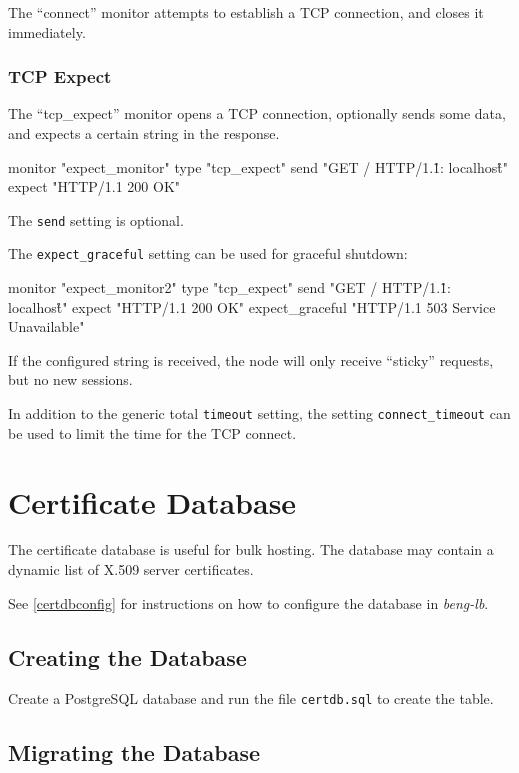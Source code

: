 \documentclass[a4paper,12pt]{article}
\begin{document}
The ``connect'' monitor attempts to establish a TCP connection, and
closes it immediately.

\subsubsection{TCP Expect}

The ``tcp\_expect'' monitor opens a TCP connection, optionally sends
some data, and expects a certain string in the response.

\begin{verbatim*}
monitor "expect_monitor" {
  type "tcp_expect"
  send "GET / HTTP/1.1\r\nHost: localhost\r\n\r\n"
  expect "HTTP/1.1 200 OK"
}
\end{verbatim*}

The \texttt{send} setting is optional.

The \verb|expect_graceful| setting can be used for graceful shutdown:

\begin{verbatim*}
monitor "expect_monitor2" {
  type "tcp_expect"
  send "GET / HTTP/1.1\r\nHost: localhost\r\n\r\n"
  expect "HTTP/1.1 200 OK"
  expect_graceful "HTTP/1.1 503 Service Unavailable"
}
\end{verbatim*}

If the configured string is received, the node will only receive
``sticky'' requests, but no new sessions.

In addition to the generic total \verb|timeout| setting, the setting
\verb|connect_timeout| can be used to limit the time for the TCP
connect.

\section{Certificate Database}
\label{certdb}

The certificate database is useful for bulk hosting.  The database may
contain a dynamic list of X.509 server certificates.

See \ref{certdbconfig} for instructions on how to configure the
database in \emph{beng-lb}.

\subsection{Creating the Database}

Create a PostgreSQL database and run the file \texttt{certdb.sql} to
create the table.

\subsection{Migrating the Database}
\end{document}
